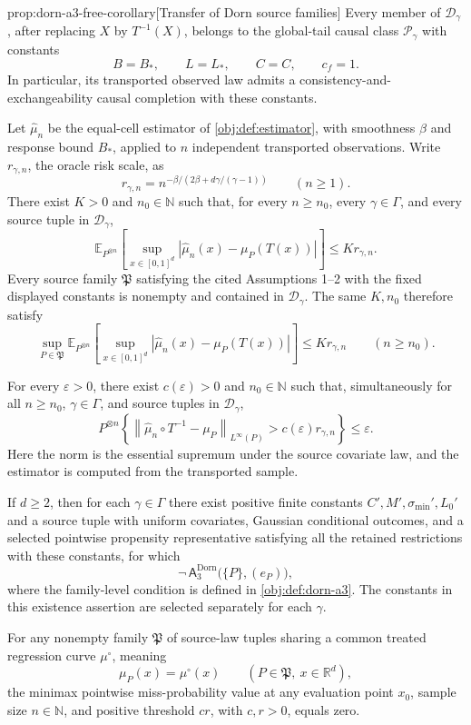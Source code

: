 \begin{propositionv}{prop:dorn-a3-free-corollary}[Transfer of Dorn source families]
Every member of \(\mathcal D_\gamma\), after replacing \(X\) by \(T^{-1}(X)\), belongs to the global-tail causal class \(\mathcal P_\gamma\) with constants
\[
B=B_*,
\qquad L=L_*,
\qquad C=C,
\qquad c_f=1.
\]
In particular, its transported observed law admits a consistency-and-exchangeability causal completion with these constants.

Let \(\widehat\mu_n\) be the equal-cell estimator of \cref{obj:def:estimator}, with smoothness \(\beta\) and response bound \(B_*\), applied to \(n\) independent transported observations. Write \(r_{\gamma,n}\), the oracle risk scale, as
\[
r_{\gamma,n}=n^{-\beta/(2\beta+d\gamma/(\gamma-1))}
\qquad(n\ge1).
\]
There exist \(K>0\) and \(n_0\in\mathbb N\) such that, for every \(n\ge n_0\), every \(\gamma\in\Gamma\), and every source tuple in \(\mathcal D_\gamma\),
\[
\mathbb E_{P^{\otimes n}}
\left[
\sup_{x\in[0,1]^d}
\left|\widehat\mu_n(x)-\mu_P(T(x))\right|
\right]
\le K r_{\gamma,n}.
\]
Every source family \(\mathfrak P\) satisfying the cited Assumptions 1--2 with the fixed displayed constants is nonempty and contained in \(\mathcal D_\gamma\). The same \(K,n_0\) therefore satisfy
\[
\sup_{P\in\mathfrak P}
\mathbb E_{P^{\otimes n}}
\left[
\sup_{x\in[0,1]^d}
\left|\widehat\mu_n(x)-\mu_P(T(x))\right|
\right]
\le K r_{\gamma,n}
\qquad(n\ge n_0).
\]

For every \(\varepsilon>0\), there exist \(c(\varepsilon)>0\) and \(n_0\in\mathbb N\) such that, simultaneously for all \(n\ge n_0\), \(\gamma\in\Gamma\), and source tuples in \(\mathcal D_\gamma\),
\[
P^{\otimes n}\!\left\{
\left\|\widehat\mu_n\circ T^{-1}-\mu_P\right\|_{L^\infty(P)}
>c(\varepsilon)r_{\gamma,n}
\right\}\le\varepsilon.
\]
Here the norm is the essential supremum under the source covariate law, and the estimator is computed from the transported sample.

If \(d\ge2\), then for each \(\gamma\in\Gamma\) there exist positive finite constants \(C',M',\sigma_{\min}',L_0'\) and a source tuple with uniform covariates, Gaussian conditional outcomes, and a selected pointwise propensity representative satisfying all the retained restrictions with these constants, for which
\[
\neg\,
\mathsf A_{3}^{\mathrm{Dorn}}
\bigl(\{P\},(e_P)\bigr),
\]
where the family-level condition is defined in \cref{obj:def:dorn-a3}. The constants in this existence assertion are selected separately for each \(\gamma\).

For any nonempty family \(\mathfrak P\) of source-law tuples sharing a common treated regression curve \(\mu^\circ\), meaning
\[
\mu_P(x)=\mu^\circ(x)
\qquad(P\in\mathfrak P,\ x\in\mathbb R^d),
\]
the minimax pointwise miss-probability value at any evaluation point \(x_0\), sample size \(n\in\mathbb N\), and positive threshold \(cr\), with \(c,r>0\), equals zero.


\end{propositionv}
